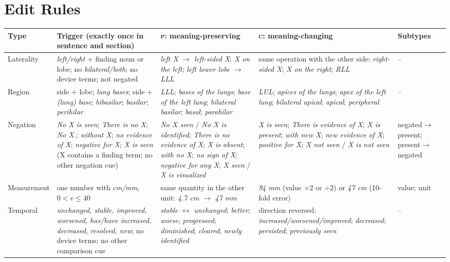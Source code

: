 \documentclass[11pt]{article}
\newcommand{\Pc}{\textsc{p}\xspace}
\newcommand{\Cc}{\textsc{c}\xspace}
\begin{document}


\clearpage
\appendix

\section{Edit Rules}
\label{app:rules}

\begin{table}[t]
\centering
\scriptsize
\setlength{\tabcolsep}{4pt}
\begin{tabular}{p{}p{}p{}p{}p{}}
\toprule
\textbf{Type} & \textbf{Trigger (exactly once in sentence and section)} & \textbf{\Pc: meaning-preserving} & \textbf{\Cc: meaning-changing} & \textbf{Subtypes} \\
\midrule
Laterality & \emph{left/right} + finding noun or lobe; no \emph{bilateral/both}; no device terms; not negated & \emph{left X} $\to$ \emph{left-sided X}; \emph{X on the left}; \emph{left lower lobe} $\to$ \emph{LLL} & same operation with the other side: \emph{right-sided X}; \emph{X on the right}; \emph{RLL} & -- \\
Region & side + lobe; \emph{lung bases}; side + \emph{(lung) base}; \emph{bibasilar}; \emph{basilar}; \emph{perihilar} & \emph{LLL}; \emph{bases of the lungs}; \emph{base of the left lung}; \emph{bilateral basilar}; \emph{basal}; \emph{parahilar} & \emph{LUL}; \emph{apices of the lungs}; \emph{apex of the left lung}; \emph{bilateral apical}; \emph{apical}; \emph{peripheral} & -- \\
Negation & \emph{No X is seen}; \emph{There is no X}; \emph{No X.}; \emph{without X}; \emph{no evidence of X}; \emph{negative for X}; \emph{X is seen} (X contains a finding term; no other negation cue) & \emph{No X seen} / \emph{No X is identified}; \emph{There is no evidence of X}; \emph{X is absent}; \emph{with no X}; \emph{no sign of X}; \emph{negative for any X}; \emph{X seen} / \emph{X is visualized} & \emph{X is seen}; \emph{There is evidence of X}; \emph{X is present}; \emph{with new X}; \emph{new evidence of X}; \emph{positive for X}; \emph{X not seen} / \emph{X is not seen} & negated$\to$present; present$\to$negated \\
Measurement & one number with \emph{cm/mm}, $0<v\le40$ & same quantity in the other unit: \emph{4.7 cm} $\to$ \emph{47 mm} & \emph{94 mm} (value $\times2$ or $\div2$) or \emph{47 cm} (10-fold error) & value; unit \\
Temporal & \emph{unchanged, stable, improved, worsened, has/have increased, decreased, resolved, new}; no device terms; no other comparison cue & \emph{stable} $\leftrightarrow$ \emph{unchanged}; \emph{better}; \emph{worse}; \emph{progressed}; \emph{diminished}; \emph{cleared}; \emph{newly identified} & direction reversed: \emph{increased/worsened/improved}; \emph{decreased}; \emph{persisted}; \emph{previously seen} & -- \\

\end{tabular}
\end{table}
\end{document}
